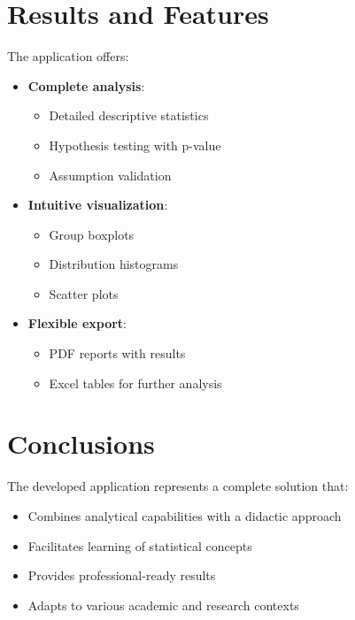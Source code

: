 \documentclass[12pt]{article}
\begin{document}
\section{Results and Features}
The application offers:

\begin{itemize}
    \item \textbf{Complete analysis}:
    \begin{itemize}
        \item Detailed descriptive statistics
        \item Hypothesis testing with p-value
        \item Assumption validation
    \end{itemize}
    \item \textbf{Intuitive visualization}:
    \begin{itemize}
        \item Group boxplots
        \item Distribution histograms
        \item Scatter plots
    \end{itemize}
    \item \textbf{Flexible export}:
    \begin{itemize}
        \item PDF reports with results
        \item Excel tables for further analysis
    \end{itemize}
\end{itemize}

\section{Conclusions}
The developed application represents a complete solution that:

\begin{itemize}
    \item Combines analytical capabilities with a didactic approach
    \item Facilitates learning of statistical concepts
    \item Provides professional-ready results
    \item Adapts to various academic and research contexts
\end{itemize}
\end{document}
